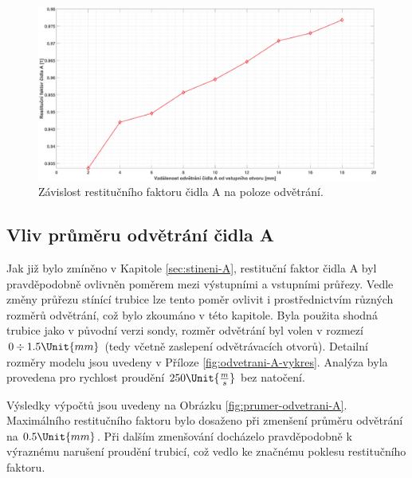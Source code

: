           \begin{figure}[ht!]
            \centering
            \includegraphics*[width=\textwidth]{400_SIMULACE_KONSTRUKCNICH_UPRAV/Grafy/06_poloha_odvetrani_A.eps}
            \caption{Závislost restitučního faktoru čidla A na poloze odvětrání.}
            \label{fig:poloha-odvetrani-A}
        \end{figure}
    
    \newpage
    \subsection{Vliv průměru odvětrání čidla A} \label{sec:prumer-odvetrani}
        Jak již bylo zmíněno v Kapitole \ref{sec:stineni-A}, restituční faktor čidla A byl pravděpodobně ovlivněn poměrem mezi výstupními a vstupními průřezy. Vedle změny průřezu stínící trubice lze tento poměr ovlivit i prostřednictvím různých rozměrů odvětrání, což bylo zkoumáno v této kapitole. Byla použita shodná trubice jako v původní verzi sondy, rozměr odvětrání byl volen v rozmezí $0 \div 1.5 \Unit{mm}$ (tedy včetně zaslepení odvětrávacích otvorů). Detailní rozměry modelu jsou uvedeny v Příloze \ref{fig:odvetrani-A-vykres}. Analýza byla provedena pro rychlost proudění $250 \Unit{\frac{m}{s}}$ bez natočení.

        Výsledky výpočtů jsou uvedeny na Obrázku \ref{fig:prumer-odvetrani-A}. Maximálního restitučního faktoru bylo dosaženo při zmenšení průměru odvětrání na $0.5 \Unit{mm}$. Při dalším zmenšování docházelo pravděpodobně k výraznému narušení proudění trubicí, což vedlo ke značnému poklesu restitučního faktoru.
        
